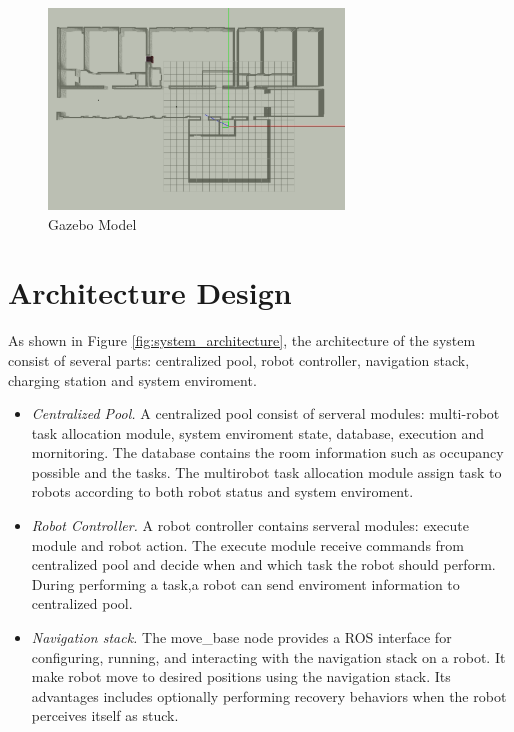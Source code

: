 \begin{figure}[htbp]
	\centering
	\includegraphics[width = 0.7\textwidth]{content/images/ch3/gazebo_model.png}
	\caption{Gazebo Model}
	\label{fig:gazebo_model}
\end{figure}

\section{Architecture Design}

As shown in Figure \ref{fig:system_architecture}, the architecture of the system consist of several parts: centralized pool, robot controller, navigation stack, charging station and system enviroment. 
\begin{itemize}
	\item \textsl{Centralized Pool.} A centralized pool consist of serveral modules: multi-robot task allocation module, system enviroment state, database, execution and mornitoring. The database contains the room information such as occupancy possible and the tasks. The multirobot task allocation module assign task to robots according to both robot status and system enviroment.
	\item \textsl{Robot Controller.} A robot controller contains serveral modules: execute module and robot action. The execute module receive commands from centralized pool and decide when and which task the robot should perform. During performing a task,a robot can send enviroment information to centralized pool.
	\item \textsl{Navigation stack.} The move\_base node provides a ROS interface for configuring, running, and interacting with the navigation stack on a robot. It make robot move to desired positions using the navigation stack. Its advantages includes optionally performing recovery behaviors when the robot perceives itself as stuck. 
\end{itemize} 

